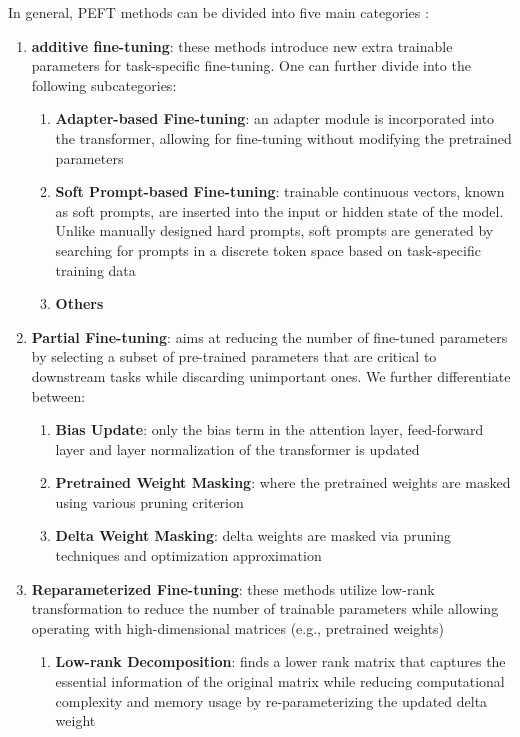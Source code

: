 In general, PEFT methods can be divided into five main categories \cite{xu2023parameterefficient}:
\begin{enumerate}
    \item \textbf{additive fine-tuning}: these methods introduce new extra trainable parameters for task-specific fine-tuning. One can further divide into the following subcategories:
    \begin{enumerate}
        \item \textbf{Adapter-based Fine-tuning}: an adapter module is incorporated into the transformer, allowing for fine-tuning without modifying the pretrained parameters 
        \item \textbf{Soft Prompt-based Fine-tuning}: trainable continuous vectors, known as soft prompts, are inserted into the input or hidden state of the model. Unlike manually designed hard prompts, soft prompts are generated by searching for prompts in a discrete token space based on task-specific training data 
        \item \textbf{Others} 
    \end{enumerate}
    \item \textbf{Partial Fine-tuning}: aims at reducing the number of fine-tuned parameters by selecting a subset of pre-trained parameters that are critical to downstream tasks while discarding unimportant ones. We further differentiate between: 
    \begin{enumerate}
        \item \textbf{Bias Update}: only the bias term in the attention layer, feed-forward layer and layer normalization of the transformer is updated
        \item \textbf{Pretrained Weight Masking}: where the pretrained weights are masked using various pruning criterion
        \item \textbf{Delta Weight Masking}: delta weights are masked via pruning techniques and optimization approximation
    \end{enumerate}
    \item \textbf{Reparameterized Fine-tuning}: these methods utilize low-rank transformation to reduce the number of trainable parameters while allowing operating with high-dimensional matrices (e.g., pretrained weights)
    \begin{enumerate}
        \item \textbf{Low-rank Decomposition}: finds a lower rank matrix that captures the essential information of the original matrix while reducing computational complexity and memory usage by re-parameterizing the updated delta weight

\end{enumerate}
\end{enumerate}
